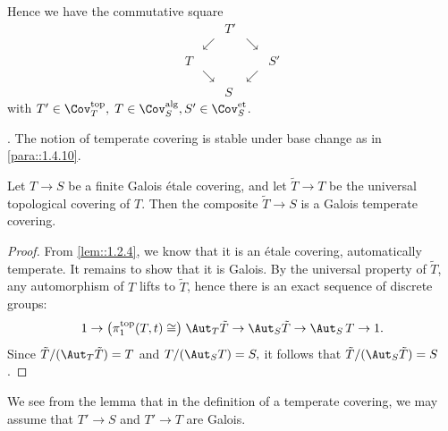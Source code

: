 Hence we have the commutative square 
\begin{equation*}
 \begin{matrix}
  &&T'&&\\
  & \swarrow &&\searrow &\\
  T&&&&S'\\
  &\searrow && \swarrow &\\
  &&S&&
 \end{matrix}
\end{equation*}
with $T'\in \Cov^{\mathrm{top}}_{T},\;T\in \Cov^{\mathrm{alg}}_{S},
S'\in \Cov^{\mathrm{et}}_S$. 

\medskip{}. The notion of temperate covering is
stable under base change as in \ref{para::1.4.10}. 
 
\begin{lem}\label{lem::2.1.2} Let $T\to S$ be a finite Galois \'etale
 covering, and let $\tilde T\to T$ be the universal topological covering
 of $T$. Then the composite $\tilde T \to S$ is a Galois temperate
 covering. 
\end{lem}

\begin{proof}
 From \ref{lem::1.2.4}, we know that it is an \'etale covering, automatically
 temperate. It remains to show that it is Galois. By the universal
 property of $\tilde T$, any automorphism of $T$ lifts to $\tilde T$,
 hence there is an exact sequence of discrete groups:
 \begin{equation*}
 1\to \bigl(\pi_1^{\mathrm{top}}(T,t) \cong\bigr)\; \Aut_T \tilde T \to
 \Aut_S \tilde T \to \Aut_S\,  T\to 1. 
 \end{equation*}
 Since $\tilde T/(\Aut_T \tilde T) =T$ and $T/(\Aut_S T)=S,$ it
 follows that $ \tilde T/(\Aut_S \tilde T)=S$.
\end{proof}


We see from the lemma that in the definition of a temperate
covering, we may assume that $T'\to S$ and $T'\to T$ are Galois.  

